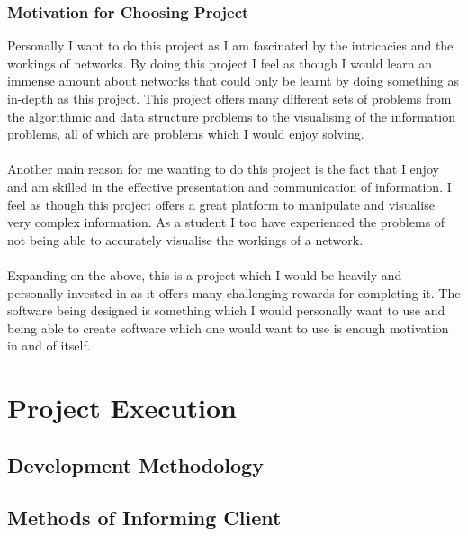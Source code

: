 \documentclass{article}
\begin{document}
		\subsubsection{Motivation for Choosing Project}
		Personally I want to do this project as I am fascinated by the intricacies and the workings of networks. By doing this project I feel as though I would learn an immense amount about networks that could only be learnt by doing something as in-depth as this project. This project offers many different sets of problems from the algorithmic and data structure problems to the visualising of the information problems, all of which are problems which I would enjoy solving.
\\\\		
		Another main reason for me wanting to do this project is the fact that I enjoy and am skilled in the effective presentation and communication of information. I feel as though this project offers a great platform to manipulate and visualise very complex information. As a student I too have experienced the problems of not being able to accurately visualise the workings of a network.
\\\\		
		Expanding on the above, this is a project which I would be heavily and personally invested in as it offers many challenging rewards for completing it. The software being designed is something which I would personally want to use and being able to create software which one would want to use is enough motivation in and of itself.

\cleardoublepage
    
\section{Project Execution}
	\subsection{Development Methodology}
		
	\subsection{Methods of Informing Client}
		
\end{document}
